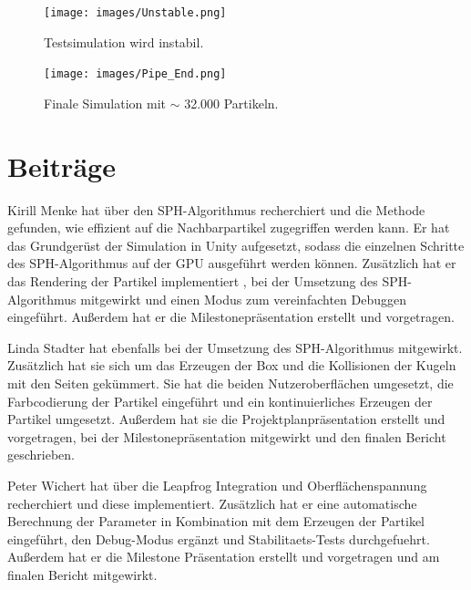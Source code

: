 \documentclass[a4paper]{paper}
\begin{document}
\begin{figure}[t]
	\centering
	\texttt{[image: images/Unstable.png]}
	\caption{Testsimulation wird instabil.}
	\label{fig:unstable}
\end{figure}
\begin{figure}[t]
	\centering
	\texttt{[image: images/Pipe\_End.png]}
	\caption{Finale Simulation mit $\sim$ 32.000 Partikeln.}
	\label{fig:final_simulation}
\end{figure}




\section{Beiträge}
Kirill Menke hat über den SPH-Algorithmus recherchiert und die Methode gefunden, wie 
effizient auf die Nachbarpartikel zugegriffen werden kann. Er hat das Grundgerüst der Simulation in Unity aufgesetzt, sodass die einzelnen Schritte des SPH-Algorithmus auf der GPU ausgeführt werden können. Zusätzlich hat er das Rendering der Partikel implementiert , bei der Umsetzung des SPH-Algorithmus mitgewirkt und einen Modus zum vereinfachten Debuggen eingeführt. Außerdem hat er die Milestonepräsentation erstellt und vorgetragen. 

Linda Stadter hat ebenfalls bei der Umsetzung des SPH-Algorithmus mitgewirkt. Zusätzlich hat sie sich um das Erzeugen der Box und die Kollisionen der Kugeln mit den Seiten gekümmert. Sie hat die beiden Nutzeroberflächen umgesetzt, die Farbcodierung der Partikel eingeführt und ein kontinuierliches Erzeugen der Partikel umgesetzt. Außerdem hat sie die Projektplanpräsentation erstellt und vorgetragen, bei der Milestonepräsentation mitgewirkt und den finalen Bericht geschrieben.

Peter Wichert hat über die Leapfrog Integration und Oberflächenspannung recherchiert und diese implementiert. Zusätzlich hat er eine automatische Berechnung der Parameter in Kombination mit dem Erzeugen der Partikel eingeführt, den Debug-Modus ergänzt und Stabilitaets-Tests durchgefuehrt. Außerdem hat er die Milestone Präsentation erstellt und vorgetragen und am finalen Bericht mitgewirkt.
\end{document}
